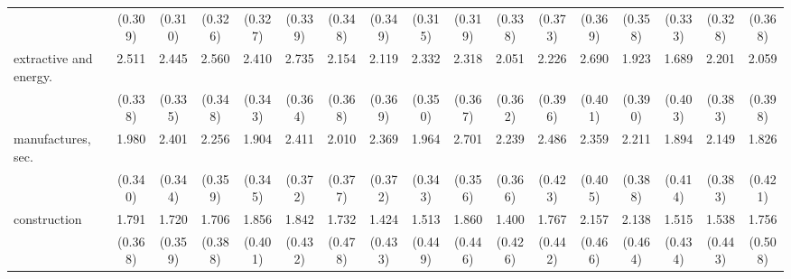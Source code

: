 {\begin{tabular}{l*{16}{c}}
                    &     (0.309)         &     (0.310)         &     (0.326)         &     (0.327)         &     (0.339)         &     (0.348)         &     (0.349)         &     (0.315)         &     (0.319)         &     (0.338)         &     (0.373)         &     (0.369)         &     (0.358)         &     (0.333)         &     (0.328)         &     (0.368)         \\
[1em]
extractive and energy.&       2.511\sym{***}&       2.445\sym{***}&       2.560\sym{***}&       2.410\sym{***}&       2.735\sym{***}&       2.154\sym{***}&       2.119\sym{***}&       2.332\sym{***}&       2.318\sym{***}&       2.051\sym{***}&       2.226\sym{***}&       2.690\sym{***}&       1.923\sym{***}&       1.689\sym{***}&       2.201\sym{***}&       2.059\sym{***}\\
                    &     (0.338)         &     (0.335)         &     (0.348)         &     (0.343)         &     (0.364)         &     (0.368)         &     (0.369)         &     (0.350)         &     (0.367)         &     (0.362)         &     (0.396)         &     (0.401)         &     (0.390)         &     (0.403)         &     (0.383)         &     (0.398)         \\
[1em]
manufactures, sec.  &       1.980\sym{***}&       2.401\sym{***}&       2.256\sym{***}&       1.904\sym{***}&       2.411\sym{***}&       2.010\sym{***}&       2.369\sym{***}&       1.964\sym{***}&       2.701\sym{***}&       2.239\sym{***}&       2.486\sym{***}&       2.359\sym{***}&       2.211\sym{***}&       1.894\sym{***}&       2.149\sym{***}&       1.826\sym{***}\\
                    &     (0.340)         &     (0.344)         &     (0.359)         &     (0.345)         &     (0.372)         &     (0.377)         &     (0.372)         &     (0.343)         &     (0.356)         &     (0.366)         &     (0.423)         &     (0.405)         &     (0.388)         &     (0.414)         &     (0.383)         &     (0.421)         \\
[1em]
construction        &       1.791\sym{***}&       1.720\sym{***}&       1.706\sym{***}&       1.856\sym{***}&       1.842\sym{***}&       1.732\sym{***}&       1.424\sym{**} &       1.513\sym{***}&       1.860\sym{***}&       1.400\sym{**} &       1.767\sym{***}&       2.157\sym{***}&       2.138\sym{***}&       1.515\sym{***}&       1.538\sym{***}&       1.756\sym{***}\\
                    &     (0.368)         &     (0.359)         &     (0.388)         &     (0.401)         &     (0.432)         &     (0.478)         &     (0.433)         &     (0.449)         &     (0.446)         &     (0.426)         &     (0.442)         &     (0.466)         &     (0.464)         &     (0.434)         &     (0.443)         &     (0.508)         \\

\end{tabular}}
